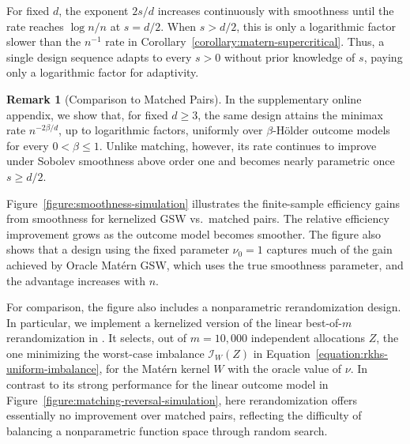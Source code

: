 \documentclass[letterpaper,12pt]{article}
\theoremstyle{definition}
\newtheorem{remark}[thm]{Remark}
\numberwithin{equation}{section}
\newcommand{\mc}{\mathcal}
\newcommand{\norm}[1]{\lVert#1\rVert}
\begin{document}
For fixed $d$, the exponent $2s/d$ increases continuously with smoothness until the rate reaches $\log n/n$ at $s=d/2$.
When $s>d/2$, this is only a logarithmic factor slower than the $n^{-1}$ rate in Corollary~\ref{corollary:matern-supercritical}.
Thus, a single design sequence adapts to every $s>0$ without prior knowledge of $s$, paying only a logarithmic factor for adaptivity.


\begin{remark}[Comparison to Matched Pairs]
In the supplementary online appendix, we show that, for fixed $d\geq3$, the same design attains the minimax rate $n^{-2\beta/d}$, up to logarithmic factors, uniformly over $\beta$-H\"older outcome models for every $0<\beta\leq1$.
Unlike matching, however, its rate continues to improve under Sobolev smoothness above order one and becomes nearly parametric once $s\geq d/2$.
\end{remark}

Figure~\ref{figure:smoothness-simulation} illustrates the finite-sample efficiency gains from smoothness for kernelized GSW vs.\ matched pairs.
The relative efficiency improvement grows as the outcome model becomes smoother.
The figure also shows that a design using the fixed parameter $\nu_0=1$ captures much of the gain achieved by Oracle Mat\'ern GSW, which uses the true smoothness parameter, and the advantage increases with $n$.

For comparison, the figure also includes a nonparametric rerandomization design. 
In particular, we implement a kernelized version of the linear best-of-$m$ rerandomization in \cite{wang2025bestchoice}.
It selects, out of $m=10{,}000$ independent allocations $Z$, the one minimizing the worst-case imbalance $\mc I_W(Z)$ in Equation~\eqref{equation:rkhs-uniform-imbalance}, for the Mat\'ern kernel $W$ with the oracle value of $\nu$.
In contrast to its strong performance for the linear outcome model in Figure~\ref{figure:matching-reversal-simulation}, here rerandomization offers essentially no improvement over matched pairs, reflecting the difficulty of balancing a nonparametric function space through random search.
\end{document}

